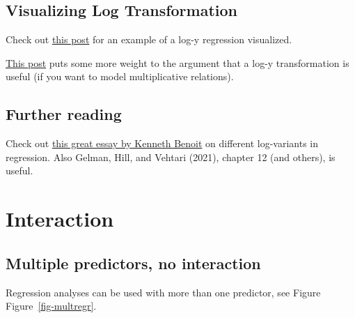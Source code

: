 \documentclass[
  letterpaper,
  DIV=11,
  numbers=noendperiod]{scrreprt}
\theoremstyle{definition}
\theoremstyle{definition}
\theoremstyle{remark}
\begin{document}
\hypertarget{visualizing-log-transformation}{%
\subsection{Visualizing Log
Transformation}\label{visualizing-log-transformation}}

Check out
\href{https://data-se.netlify.app/2022/01/14/visualizing-a-log-y-regression-model/}{this
post} for an example of a log-y regression visualized.

\href{https://data-se.netlify.app/2021/06/17/ein-beispiel-zum-nutzen-einer-log-transformation/}{This
post} puts some more weight to the argument that a log-y transformation
is useful (if you want to model multiplicative relations).

\hypertarget{further-reading-1}{%
\subsection{Further reading}\label{further-reading-1}}

Check out
\href{https://kenbenoit.net/assets/courses/ME104/logmodels2.pdf}{this
great essay by Kenneth Benoit} on different log-variants in regression.
Also Gelman, Hill, and Vehtari (2021), chapter 12 (and others), is
useful.

\hypertarget{interaction}{%
\section{Interaction}\label{interaction}}

\hypertarget{multiple-predictors-no-interaction}{%
\subsection{Multiple predictors, no
interaction}\label{multiple-predictors-no-interaction}}

Regression analyses can be used with more than one predictor, see Figure
Figure~\ref{fig-multregr}.
\end{document}
